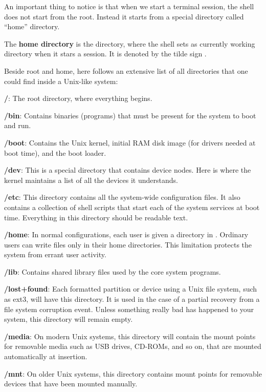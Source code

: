 An important thing to notice is that when we start a terminal session, the shell does not start from the root. Instead
it starts from a special directory called ``home'' directory.

The \textbf{home directory} is the directory, where the shell sets as currently working directory when it stars a
session. It is denoted by the tilde sign \code{$\sim$}.
\ed

Beside root and home, here follows an extensive list of all directories that one could find inside a Unix-like system:
\bit
\item \textbf{/}: The root directory, where everything begins.
\item \textbf{/bin}: Contains binaries (programs) that must be present for the system to boot and run.
\item \textbf{/boot}: Contains the Unix kernel, initial RAM disk image (for drivers needed at boot time), and the
boot loader.
\item \textbf{/dev}: This is a special directory that contains device nodes. Here is where the kernel maintains a list
of all the devices it understands.
\item \textbf{/etc}: This directory contains all the system-wide configuration files. It also contains a
collection of shell scripts that start each of the system services at boot time. Everything in this directory should
be readable text.
\item \textbf{/home}: In normal configurations, each user is given a directory in . Ordinary users can write
files only in their home directories. This limitation protects the system from errant user activity.
\item \textbf{/lib}: Contains shared library files used by the core system programs.
\item \textbf{/lost+found}: Each formatted partition or device using a Unix file system, such as ext3, will have
this directory. It is used in the case of a partial recovery from a file system corruption event. Unless something
really bad has happened to your system, this directory will remain empty.
\item \textbf{/media}: On modern Unix systems, this directory will contain the mount points for removable
media such as USB drives, CD-ROMs, and so on, that are mounted automatically at insertion.
\item \textbf{/mnt}: On older Unix systems, this directory contains mount points for removable devices that have
been mounted manually.
